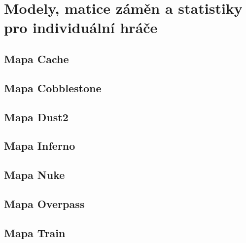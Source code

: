 \chapter{Modely, matice záměn a statistiky pro individuální hráče} \label{apx:02}
\section{Mapa Cache}



\newpage

\section{Mapa Cobblestone}



\newpage

\section{Mapa Dust2}



\newpage

\section{Mapa Inferno}



\newpage

\section{Mapa Nuke}



\newpage

\section{Mapa Overpass}



\newpage

\section{Mapa Train}



\newpage
